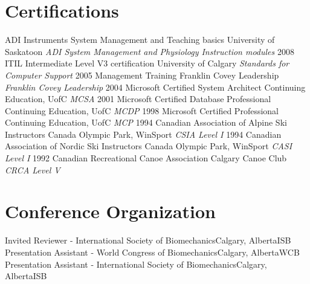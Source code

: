 \documentclass[]{friggeri-cv}
\begin{document}
\section{Certifications}
\begin{entrylist}
    {ADI Instruments System Management and Teaching basics}
    {University of Saskatoon}
    {\emph{ADI System Management and Physiology Instruction modules}}
  \entry
    {2008  }
    {ITIL Intermediate Level V3 certification}
    {University of Calgary}
    {\emph{Standards for Computer Support}}
 \entry
   {2005}
   {Management Training}
   {Franklin Covey Leadership}
   {\emph{Franklin Covey Leadership}  }
 \entry
   {2004}
   {Microsoft Certified System Architect}
   {Continuing Education, UofC}
   {\emph{MCSA}  }
 \entry
   {2001}
   {Microsoft Certified Database Professional}
   {Continuing Education, UofC}
   {\emph{MCDP}  }
 \entry
   {1998}
   {Microsoft Certified Professional}
   {Continuing Education, UofC}
   {\emph{MCP}  }
 \entry
   {1994}
   {Canadian Association of Alpine Ski Instructors}
   {Canada Olympic Park, WinSport}
   {\emph{CSIA Level I}  }
  \entry
   {1994}
   {Canadian Association of Nordic Ski Instructors}
   {Canada Olympic Park, WinSport}
   {\emph{CASI Level I}  }
  \entry
   {1992}
   {Canadian Recreational Canoe Association}
   {Calgary Canoe Club}
   {\emph{CRCA Level V}  }
   
\end{entrylist}
\section{Conference Organization}
    \begin{entrylist}
      {Invited Reviewer - International Society of Biomechanics}{Calgary, Alberta}{ISB}
     {Presentation Assistant - World Congress of Biomechanics}{Calgary, Alberta}{WCB}
     {Presentation Assistant - International Society of Biomechanics}{Calgary, Alberta}{ISB}
    \end{entrylist}
\end{document}
